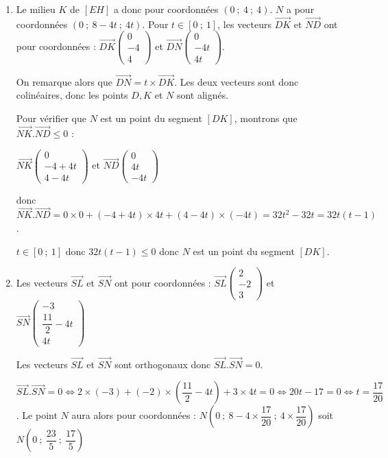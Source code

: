 \documentclass[10pt]{article}
\providecommand{\vect}[1]{\overrightarrow{#1}}
\begin{document}
\begin{enumerate}
\begin{enumerate}
Donc $x=3+2k=5$, $y =\dfrac52-2k=\dfrac12$ et $z=3k=3$.
Le point $L$ a pour coordonnées $\left(5~;~\dfrac12~;~3\right)$.
	\end{enumerate}
	\item Le milieu $K$ de $[EH]$ a donc pour coordonnées $\left(0~;~4~;~4\right)$. $N$ a pour coordonnées $(0~;~8 - 4t~;~4t)$. Pour $t\in [0~;~1]$, les vecteurs $\vect{DK}$ et $\vect{ND}$ ont pour coordonnées  : \(\overrightarrow{DK}\begin{pmatrix}0\\-4\\4\end{pmatrix}\) et \(\overrightarrow{DN}\begin{pmatrix}0\\-4t\\4t\end{pmatrix}\).
	
	On remarque alors que $\vect{DN}=t\times \vect{DK}$. Les deux vecteurs sont donc colinéaires, donc les points $D, K$ et $N$ sont alignés.
	
	Pour vérifier que $N$ est un point du segment $[DK]$, montrons que $\vect{NK}.\vect{ND}\leqslant 0$ :
	
	\(\overrightarrow{NK}\begin{pmatrix}0\\-4+4t\\4-4t\end{pmatrix}\) et \(\overrightarrow{ND}\begin{pmatrix}0\\4t\\-4t\end{pmatrix}\) 
	
	donc $\vect{NK}.\vect{ND}=0\times 0+(-4+4t)\times 4t+(4-4t)\times (-4t) =32t^2-32t =32t(t-1)$.
	
	$t\in [0~;~1]$ donc $32t(t-1)\leqslant 0$ donc $N$ est un point du segment $[DK]$.
	\item Les vecteurs $\vect{SL}$ et $\vect{SN}$ ont pour coordonnées : \(\overrightarrow{SL}\begin{pmatrix}2\\-2\\3\end{pmatrix}\) et \(\overrightarrow{SN}\begin{pmatrix}-3\\\dfrac{11}{2}-4t\\4t\end{pmatrix}\)
	
Les vecteurs $\vect{SL}$ et $\vect{SN}$ sont orthogonaux donc $\vect{SL}.\vect{SN}=0$.
	
	$\vect{SL}.\vect{SN}=0 \iff 2\times(-3)+(-2)\times \left(\dfrac{11}{2}-4t\right)+3\times 4t=0 \iff 20t-17=0 \iff t=\dfrac{17}{20}$.
	Le point $N$ aura alors pour coordonnées : $N\left(0~;~8-4\times\dfrac{17}{20}~;~4\times \dfrac{17}{20} \right)$ soit $N\left(0~;~\dfrac{23}{5}~;~\dfrac{17}{5} \right)$
	\end{enumerate}

\bigskip
\end{document}
